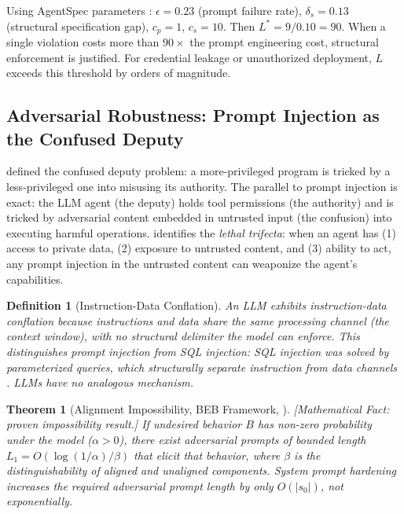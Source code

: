 \documentclass[11pt, a4paper]{googledeepmind}
\newtheorem{definition}{Definition}[section]
\newtheorem{theorem}{Theorem}[section]
\begin{document}
Using AgentSpec parameters \citep{wang2026agentspec}: $\epsilon = 0.23$ (prompt failure rate), $\delta_s = 0.13$ (structural specification gap), $c_p = 1$, $c_s = 10$. Then $L^* = 9/0.10 = 90$. When a single violation costs more than $90\times$ the prompt engineering cost, structural enforcement is justified. For credential leakage or unauthorized deployment, $L$ exceeds this threshold by orders of magnitude.

\subsection{Adversarial Robustness: Prompt Injection as the Confused Deputy}

\citet{hardy1988confused} defined the confused deputy problem: a more-privileged program is tricked by a less-privileged one into misusing its authority. The parallel to prompt injection is exact: the LLM agent (the deputy) holds tool permissions (the authority) and is tricked by adversarial content embedded in untrusted input (the confusion) into executing harmful operations. \citet{willison2024trifecta} identifies the \emph{lethal trifecta}: when an agent has (1) access to private data, (2) exposure to untrusted content, and (3) ability to act, any prompt injection in the untrusted content can weaponize the agent's capabilities.

\begin{definition}[Instruction-Data Conflation]
\label{def:conflation-sec}
An LLM exhibits instruction-data conflation because instructions and data share the same processing channel (the context window), with no structural delimiter the model can enforce. This distinguishes prompt injection from SQL injection: SQL injection was solved by parameterized queries, which structurally separate instruction from data channels \citep{ncsc2023prompt}. LLMs have no analogous mechanism.
\end{definition}

\begin{theorem}[Alignment Impossibility, BEB Framework, \citealp{wolf2024fundamental}]
\emph{[Mathematical Fact: proven impossibility result.]}
\label{thm:beb-sec}
If undesired behavior $B$ has non-zero probability under the model ($\alpha > 0$), there exist adversarial prompts of bounded length $L_1 = O(\log(1/\alpha)/\beta)$ that elicit that behavior, where $\beta$ is the distinguishability of aligned and unaligned components. System prompt hardening increases the required adversarial prompt length by only $O(|s_0|)$, not exponentially.
\end{theorem}
\end{document}
